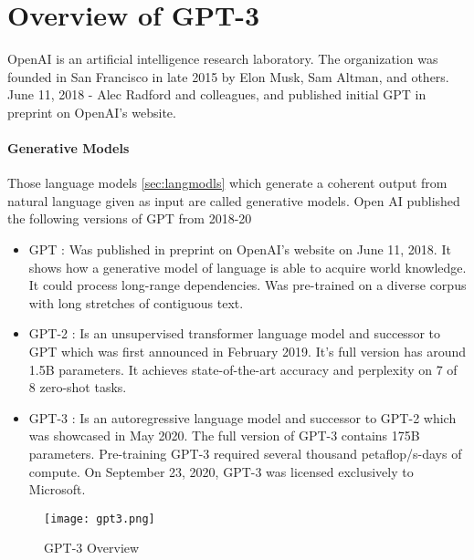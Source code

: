 \chapter*{Overview of GPT-3}
\label{chap:overview}
\thispagestyle{fancy}

OpenAI is an artificial intelligence research laboratory. The organization was founded in San Francisco in late 2015 by Elon Musk, Sam Altman, and others. June 11, 2018 - Alec Radford and colleagues, and published initial GPT in preprint on OpenAI's website. 

\subsubsection*{Generative Models}
\label{subsub:genmodls}

\hspace{0.5cm} Those language models \eqref{sec:langmodls} which generate a coherent output from natural language given as input are called generative models. Open AI published the following versions of GPT from 2018-20

\begin{itemize}
    \item GPT : Was published in preprint on OpenAI's website on June 11, 2018. It shows how a generative model of language is able to acquire world knowledge. It could process long-range dependencies. Was pre-trained on a diverse corpus with long stretches of contiguous text.
    \item GPT-2 : Is an unsupervised transformer language model and successor to GPT which was first announced in February 2019. It's full version has around 1.5B parameters. It achieves state-of-the-art accuracy and perplexity on 7 of 8 zero-shot tasks.
    \item GPT-3 : Is an autoregressive language model and successor to GPT-2 which was showcased in May 2020. The full version of GPT-3 contains 175B parameters. Pre-training GPT-3 required several thousand petaflop/s-days of compute. On September 23, 2020, GPT-3 was licensed exclusively to Microsoft.
\end{itemize}

\begin{figure}[!htbp]
    \centering
    \texttt{[image: gpt3.png]}
    \caption[GPT-3 Overview]{GPT-3 Overview}
    \label{fig:gpt3ovrviw}
\end{figure}

\vspace*{\fill}